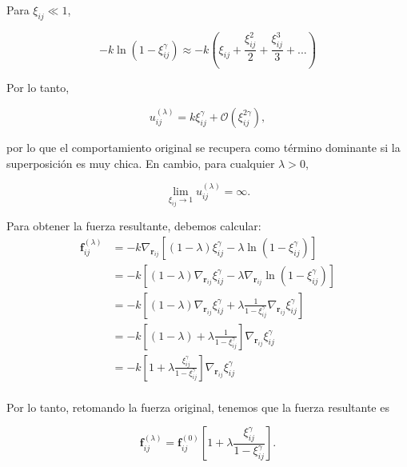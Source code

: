 \documentclass[11pt,a4paper]{article}
\begin{document}
Para $\xi_{ij}\ll1$,

\begin{equation}
	-k\ln\left(1-\xi_{ij}^{\gamma}\right) \approx -k\left(\xi_{ij}+\frac{\xi_{ij}^{2}}{2}+\frac{\xi_{ij}^{3}}{3}+...\right)
\end{equation}

Por lo tanto,

\begin{equation}
u_{ij}^{(\lambda)}
=
k\xi_{ij}^{\gamma}
+
\mathcal O\left(\xi_{ij}^{2\gamma}\right),
\end{equation}

por lo que el comportamiento original se recupera como término dominante si la superposición es muy chica. En cambio, para cualquier $\lambda>0$,

\begin{equation}
\lim_{\xi_{ij}\rightarrow1}
u_{ij}^{(\lambda)}
=\infty.
\end{equation}

Para obtener la fuerza resultante, debemos calcular:
\begin{equation}
	\begin{split}
		\mathbf f_{ij}^{(\lambda)}
		&= -k\nabla_{\mathbf{r}_{ij}} \left[ (1-\lambda)\xi_{ij}^{\gamma} - \lambda\ln\left(1-\xi_{ij}^{\gamma}\right) \right] \\
		&= -k \left[ (1-\lambda)\nabla_{\mathbf{r}_{ij}}\xi_{ij}^{\gamma} - \lambda \nabla_{\mathbf{r}_{ij}} \ln\left(1-\xi_{ij}^{\gamma}\right) \right] \\
		&= -k \left[ (1-\lambda)\nabla_{\mathbf{r}_{ij}}\xi_{ij}^{\gamma} + \lambda  \frac{1}{1-\xi_{ij}^{\gamma}} \nabla_{\mathbf{r}_{ij}}\xi_{ij}^{\gamma} \right]\\
		&= -k \left[ (1-\lambda) + \lambda  \frac{1}{1-\xi_{ij}^{\gamma}}  \right]\nabla_{\mathbf{r}_{ij}}\xi_{ij}^{\gamma}\\
		&= -k \left[1 + \lambda  \frac{\xi_{ij}^{\gamma}}{1-\xi_{ij}^{\gamma}}  \right]\nabla_{\mathbf{r}_{ij}}\xi_{ij}^{\gamma}\\
	\end{split}
\end{equation}

Por lo tanto, retomando la fuerza original, tenemos que la fuerza resultante es

\begin{equation}
\boxed{
\mathbf f_{ij}^{(\lambda)}
=
\mathbf f_{ij}^{(0)}
\left[
1
+
\lambda
\frac{\xi_{ij}^{\gamma}}
{1-\xi_{ij}^{\gamma}}
\right]
}.
\label{eq:regularized_force}
\end{equation}
\end{document}
